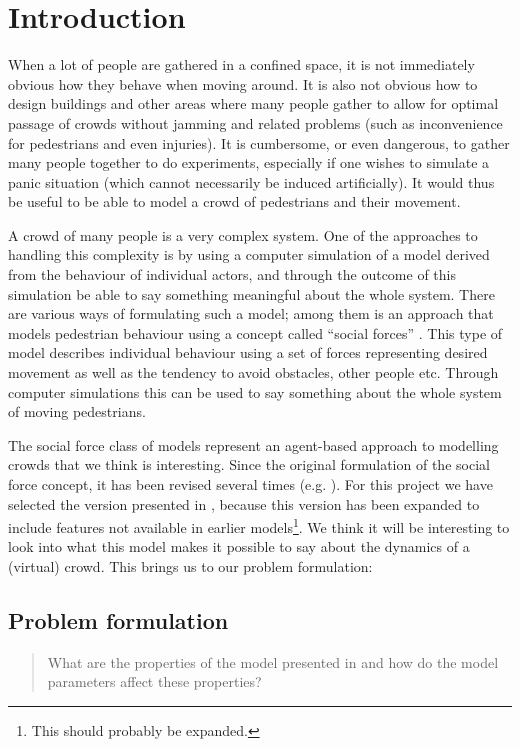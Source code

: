 \section{Introduction}
When a lot of people are gathered in a confined space, it is not immediately 
obvious how they behave when moving around. It is also not obvious how to 
design buildings and other areas where many people gather to allow for optimal 
passage of crowds without jamming and related problems (such as inconvenience 
for pedestrians and even injuries). It is cumbersome, or even dangerous, to 
gather many people together to do experiments, especially if one wishes to 
simulate a panic situation (which cannot necessarily be induced artificially).  
It would thus be useful to be able to model a crowd of pedestrians and their 
movement.

A crowd of many people is a very complex system. One of the approaches to 
handling this complexity is by using a computer simulation of a model derived 
from the behaviour of individual actors, and through the outcome of this 
simulation be able to say something meaningful about the whole system. There 
are various ways of formulating such a model; among them is an approach that 
models pedestrian behaviour using a concept called ``social forces'' 
\cite{social-force}. This type of model describes individual behaviour using a 
set of forces representing desired movement as well as the tendency to avoid 
obstacles, other people etc. Through computer simulations this can be used to 
say something about the whole system of moving pedestrians.

The social force class of models represent an agent-based approach to 
modelling crowds that we think is interesting. Since the original formulation 
of the social force concept, it has been revised several times (e.g.  
\cite{helbing00}). For this project we have selected the version presented in 
\cite{self-org}, because this version has been expanded to include features 
not available in earlier models\footnote{This should probably be expanded.}.  
We think it will be interesting to look into what this model makes it possible 
to say about the dynamics of a (virtual) crowd. This brings us to our problem 
formulation:

\subsection{Problem formulation}
\begin{quote}
    What are the properties of the model presented in \cite{self-org} and how 
    do the model parameters affect these properties?
\end{quote}

